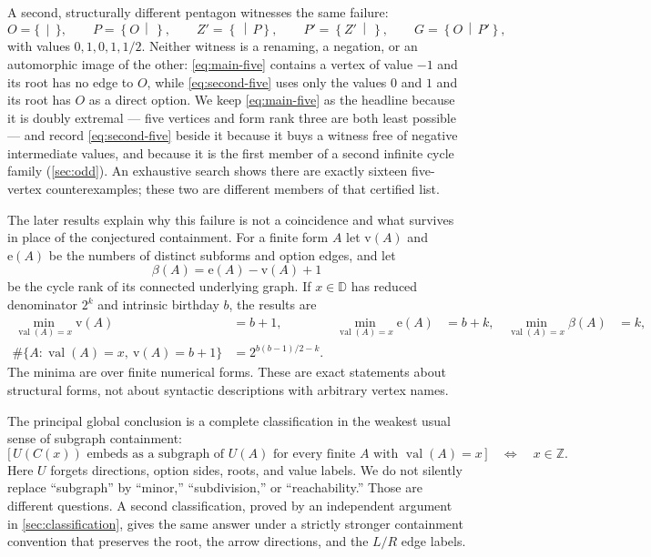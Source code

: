 \documentclass[11pt,a4paper]{article}
\numberwithin{equation}{section}
\theoremstyle{definition}
\theoremstyle{remark}
\newcommand{\D}{\mathbb{D}}
\newcommand{\Z}{\mathbb{Z}}
\newcommand{\val}{\operatorname{val}}
\newcommand{\cut}[2]{\left\{#1\,\middle|\,#2\right\}}
\newcommand{\emptycut}{\{\,\mid\,\}}
\newcommand{\can}{C}
\newcommand{\sizeV}{\mathrm{v}}
\newcommand{\sizeE}{\mathrm{e}}
\begin{document}
A second, structurally different pentagon witnesses the same failure:
\begin{equation}
\label{eq:second-five}
 O=\emptycut,\qquad
 P=\cut{O}{},\qquad
 Z'=\cut{}{P},\qquad
 P'=\cut{Z'}{},\qquad
 G=\cut{O}{P'},
\end{equation}
with values $0,1,0,1,1/2$. Neither witness is a renaming, a negation, or an
automorphic image of the other: \eqref{eq:main-five} contains a vertex of value
$-1$ and its root has no edge to $O$, while \eqref{eq:second-five} uses only the
values $0$ and $1$ and its root has $O$ as a direct option. We keep
\eqref{eq:main-five} as the headline because it is doubly extremal --- five
vertices and form rank three are both least possible --- and record
\eqref{eq:second-five} beside it because it buys a witness free of negative
intermediate values, and because it is the first member of a second infinite
cycle family (\cref{sec:odd}). An exhaustive search shows there are exactly
sixteen five-vertex counterexamples; these two are different members of that
certified list.

The later results explain why this failure is not a coincidence and what
survives in place of the conjectured containment. For a finite form $A$ let
$\sizeV(A)$ and $\sizeE(A)$ be the numbers of distinct subforms and option
edges, and let
\begin{equation}
 \beta(A)=\sizeE(A)-\sizeV(A)+1
\end{equation}
be the cycle rank of its connected underlying graph. If $x\in\D$ has reduced
denominator $2^k$ and intrinsic birthday $b$, the results are
\begin{align}
 \min_{\val(A)=x}\sizeV(A)&=b+1, &
 \min_{\val(A)=x}\sizeE(A)&=b+k, &
 \min_{\val(A)=x}\beta(A)&=k, \label{eq:overview-minima}\\
 \#\{A:\val(A)=x,\ \sizeV(A)=b+1\}
   &=2^{b(b-1)/2-k}. &&& \label{eq:overview-count}
\end{align}
The minima are over finite numerical forms. These are exact statements about
structural forms, not about syntactic descriptions with arbitrary vertex names.

The principal global conclusion is a complete classification in the weakest
usual sense of subgraph containment:
\begin{equation}
\label{eq:overview-classification}
 \bigl[\,U(\can(x))\text{ embeds as a subgraph of }U(A)
              \text{ for every finite }A\text{ with }\val(A)=x\,\bigr]
 \quad\Longleftrightarrow\quad x\in\Z.
\end{equation}
Here $U$ forgets directions, option sides, roots, and value labels. We do not
silently replace ``subgraph'' by ``minor,'' ``subdivision,'' or ``reachability.''
Those are different questions. A second classification, proved by an independent
argument in \cref{sec:classification}, gives the same answer under a strictly
stronger containment convention that preserves the root, the arrow directions,
and the $L/R$ edge labels.
\end{document}
